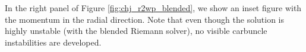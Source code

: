 \documentclass[preprint, 11pt]{article}
\begin{document}
In the right panel of Figure \ref{fig:chj_r2wp_blended}, we show an inset figure 
with the momentum in the radial direction. Note that even though the solution is highly unstable 
(with the blended Riemann solver), no visible carbuncle instabilities are developed. 


\begin{figure}[!h]
  \centering
\end{figure}
\end{document}

